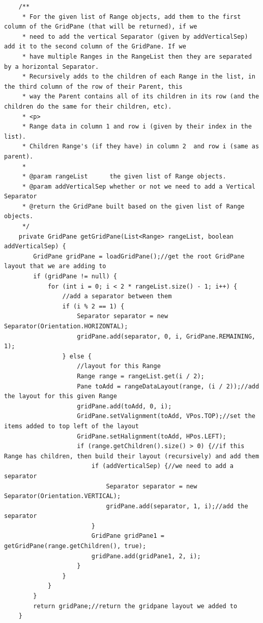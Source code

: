 \begin{lstlisting}
    /**
     * For the given list of Range objects, add them to the first column of the GridPane (that will be returned), if we
     * need to add the vertical Separator (given by addVerticalSep) add it to the second column of the GridPane. If we
     * have multiple Ranges in the RangeList then they are separated by a horizontal Separator.
     * Recursively adds to the children of each Range in the list, in the third column of the row of their Parent, this
     * way the Parent contains all of its children in its row (and the children do the same for their children, etc).
     * <p>
     * Range data in column 1 and row i (given by their index in the list).
     * Children Range's (if they have) in column 2  and row i (same as parent).
     *
     * @param rangeList      the given list of Range objects.
     * @param addVerticalSep whether or not we need to add a Vertical Separator
     * @return the GridPane built based on the given list of Range objects.
     */
    private GridPane getGridPane(List<Range> rangeList, boolean addVerticalSep) {
        GridPane gridPane = loadGridPane();//get the root GridPane layout that we are adding to
        if (gridPane != null) {
            for (int i = 0; i < 2 * rangeList.size() - 1; i++) {
                //add a separator between them
                if (i % 2 == 1) {
                    Separator separator = new Separator(Orientation.HORIZONTAL);
                    gridPane.add(separator, 0, i, GridPane.REMAINING, 1);
                } else {
                    //layout for this Range
                    Range range = rangeList.get(i / 2);
                    Pane toAdd = rangeDataLayout(range, (i / 2));//add the layout for this given Range
                    gridPane.add(toAdd, 0, i);
                    GridPane.setValignment(toAdd, VPos.TOP);//set the items added to top left of the layout
                    GridPane.setHalignment(toAdd, HPos.LEFT);
                    if (range.getChildren().size() > 0) {//if this Range has children, then build their layout (recursively) and add them
                        if (addVerticalSep) {//we need to add a separator
                            Separator separator = new Separator(Orientation.VERTICAL);
                            gridPane.add(separator, 1, i);//add the separator
                        }
                        GridPane gridPane1 = getGridPane(range.getChildren(), true);
                        gridPane.add(gridPane1, 2, i);
                    }
                }
            }
        }
        return gridPane;//return the gridpane layout we added to
    }


\end{lstlisting}
